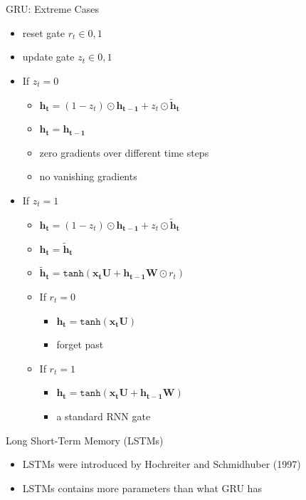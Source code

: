 \documentclass[12pt]{beamer}
\begin{document}
\begin{frame}{GRU: Extreme Cases}
	\centering
	\begin{itemize}
		\item reset gate $r_t \in {0,1}$
		\item update gate $z_t \in {0,1}$
		\item If $z_t = 0$
		\begin{itemize}
			\item $\bm{h_t} = (1-z_t) \odot \bm{h_{t-1}} + z_t \odot \bm{\tilde{h}_t}$ 
			\item $\bm{h_t} = \bm{h_{t-1}}$
			\item zero gradients over different time steps 
			\item no vanishing gradients
		\end{itemize}
		\item If $z_t =1$
		\begin{itemize}
			\item $\bm{h_t} = (1-z_t) \odot \bm{h_{t-1}} + z_t \odot \bm{\tilde{h}_t}$ 
			\item $\bm{h_t} = \bm{\tilde{h}_t}$
			\item  $\bm{\tilde{h}_t} = \texttt{tanh} ( \bm{x_t} \bm{U} + \bm{h_{t-1}} \bm{W} \odot r_t)$ 
			\item If $r_t=0$
			\begin{itemize}
				\item $\bm{h_t} = \texttt{tanh}(\bm{x_tU})$ 
				\item forget past
			\end{itemize}
			\item If $r_t =1$
			\begin{itemize}
				\item $\bm{h_t} = \texttt{tanh} ( \bm{x_t} \bm{U} + \bm{h_{t-1}} \bm{W}) $
				\item a standard RNN gate
			\end{itemize}
		\end{itemize}
	\end{itemize}
\end{frame}

\begin{frame}{Long Short-Term Memory (LSTMs)}
	\begin{itemize}
		\item LSTMs were introduced by Hochreiter and Schmidhuber (1997)
		\item LSTMs contains more parameters than what GRU has
	\end{itemize}
\end{frame}
\end{document}
